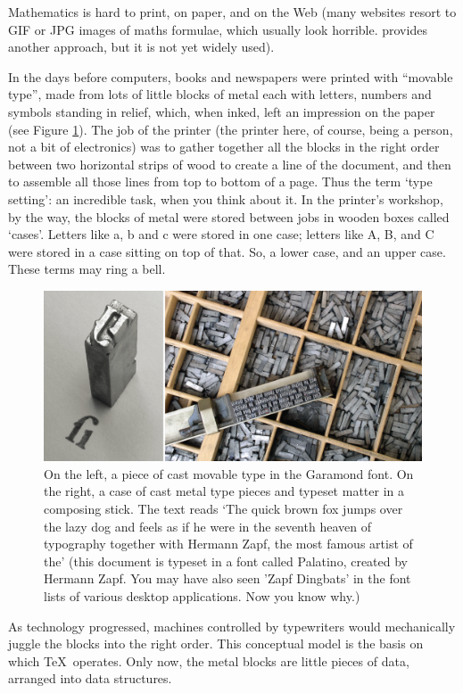 \begin{refsection}
Mathematics is hard to print, on paper, and on the Web (many websites resort to GIF or JPG images of maths formulae, which usually look horrible.  provides another approach, but it is not yet widely used).

In the days before computers, books and newspapers were printed with ``movable type'', made from lots of little blocks of metal each with letters, numbers and symbols standing in relief, which, when inked, left an impression on the paper (see Figure \ref{figure:movabletype}). The job of the printer (the printer here, of course, being a person, not a bit of electronics) was to gather together all the blocks in the right order between two horizontal strips of wood to create a line of the document, and then to assemble all those lines from top to bottom of a page. Thus the term `type setting': an incredible task, when you think about it. In the printer's workshop, by the way, the blocks of metal were stored between jobs in wooden boxes called `cases'. Letters like a, b and c were stored in one case; letters like A, B, and C were stored in a case sitting on top of that. So, a lower case, and an upper case. These terms may ring a bell.

\begin{figure}
\centerline{\includegraphics[width=12cm]{images/movable-type.png}}
\caption{On the left, a piece of cast movable type in the Garamond font. On the right, a case of cast metal type pieces and typeset matter in a composing stick. The text reads `The quick brown fox jumps over the lazy dog and feels as if he were in the seventh heaven of typography together with Hermann Zapf, the most famous artist of the' (this document is typeset in a font called Palatino, created by Hermann Zapf. You may have also seen 'Zapf Dingbats' in the font lists of various desktop applications. Now you know why.)} \label{figure:movabletype}
\end{figure}

As technology progressed, machines controlled by typewriters would mechanically juggle the blocks into the right order. This conceptual model is the basis on which \TeX\ operates. Only now, the metal blocks are little pieces of data, arranged into data structures. 


\end{refsection}
